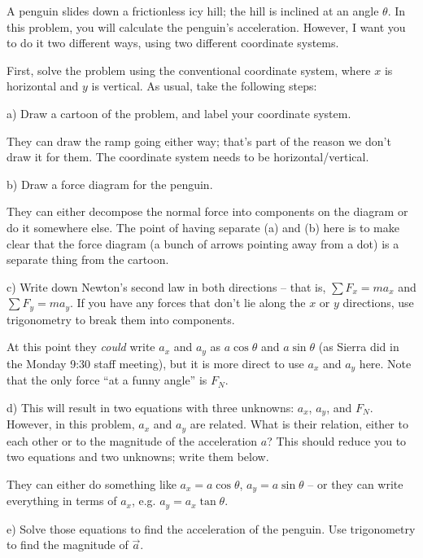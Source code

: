 \documentclass[12pt]{article}
\begin{document}
		\Large
		\centerline{}
		\normalsize
		\centerline{}
		
		A penguin slides down a frictionless icy hill; the hill is inclined at an angle $\theta$. In this problem, you will
		calculate the penguin's acceleration. However, I want you to do it two different ways, using two different coordinate systems.
		
		First, solve the problem using the conventional coordinate system, where $x$ is horizontal and $y$ is vertical. As usual, take the following steps:
		
		a) Draw a cartoon of the problem, and label your coordinate system.
		
		{\color{Red}
			They can draw the ramp going either way; that's part of the reason we don't draw it for them. The coordinate system needs to be horizontal/vertical.
		}
	
		
		b) Draw a force diagram for the penguin.
		
		{\color{Red}
			They can either decompose the normal force into components on the diagram or do it somewhere else. The point of having separate (a) and (b) here is to make clear that the force diagram (a bunch of arrows pointing away from a dot) is a separate thing from the cartoon.
}

		c) Write down Newton's second law in both directions -- that is, $\sum F_x = ma_x$ and $\sum F_y = ma_y$. If you have any forces that don't lie along the $x$ or $y$ directions, use trigonometry to break them into components.
		
		
		{\color{Red}
At this point they {\it could} write $a_x$ and $a_y$ as $a \cos \theta$ and $a \sin \theta$ (as Sierra did in the Monday 9:30 staff meeting), but it is more direct to use $a_x$ and $a_y$ here. Note that the only force ``at a funny angle'' is $F_N$.
}
		

		d) This will result in two equations with three unknowns: $a_x$, $a_y$, and $F_N$. However, in this problem, $a_x$ and $a_y$ are related. What is their relation, either to each other or to the magnitude of the acceleration $a$? This should reduce you to two equations and two unknowns; write them below.

{\color{Red}
	They can either do something like $a_x = a \cos \theta$, $a_y = a \sin \theta$ -- or they can write everything in terms of $a_x$, e.g. $a_y = a_x \tan \theta$.
}
		
		e) Solve those equations to find the acceleration of the penguin. Use trigonometry to find the magnitude of $\vec a$.
		
\end{document}
